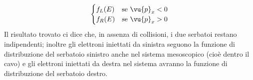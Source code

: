 \begin{example}
\begin{equation*}
\begin{cases}
            f_L(E) & \text{se } \vu{p}_x<0 \\
            f_R(E) & \text{se } \vu{p}_x>0
        \end{cases}
    \end{equation*}
    Il risultato trovato ci dice che, in assenza di collisioni, i due serbatoi restano indipendenti; inoltre gli elettroni iniettati da sinistra seguono la funzione di distribuzione del serbatoio sinistro anche nel sistema mesoscopico (cioè dentro il cavo) e gli elettroni iniettati da destra nel sistema avranno la funzione di distribuzione del serbatoio destro.
\end{example}
